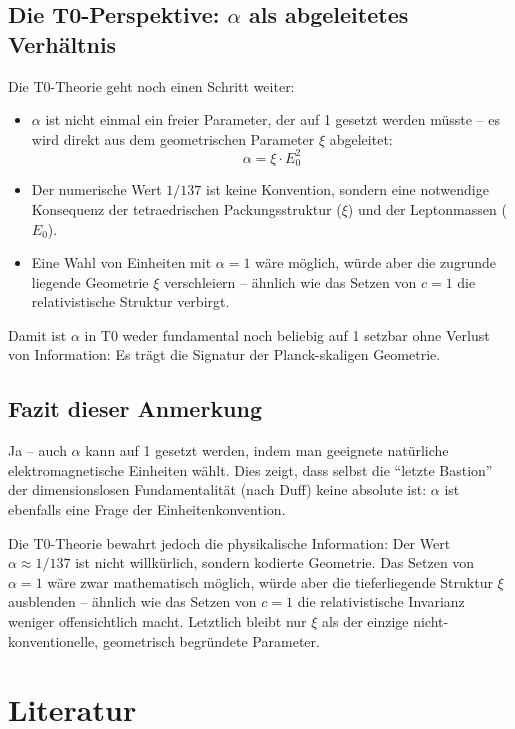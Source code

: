\subsection{Die T0-Perspektive: \(\alpha\) als abgeleitetes Verhältnis}

Die T0-Theorie geht noch einen Schritt weiter:
\begin{itemize}
	\item \(\alpha\) ist nicht einmal ein freier Parameter, der auf 1 gesetzt werden müsste – es wird direkt aus dem geometrischen Parameter \(\xi\) abgeleitet:
	\[
	\alpha = \xi \cdot E_0^2
	\]
	\item Der numerische Wert \(1/137\) ist keine Konvention, sondern eine notwendige Konsequenz der tetraedrischen Packungsstruktur (\(\xi\)) und der Leptonmassen (\(E_0\)).
	\item Eine Wahl von Einheiten mit \(\alpha = 1\) wäre möglich, würde aber die zugrunde liegende Geometrie \(\xi\) verschleiern – ähnlich wie das Setzen von \(c = 1\) die relativistische Struktur verbirgt.
\end{itemize}

Damit ist \(\alpha\) in T0 weder fundamental noch beliebig auf 1 setzbar ohne Verlust von Information: Es trägt die Signatur der Planck-skaligen Geometrie.

\subsection{Fazit dieser Anmerkung}

Ja – auch \(\alpha\) kann auf 1 gesetzt werden, indem man geeignete natürliche elektromagnetische Einheiten wählt. Dies zeigt, dass selbst die ``letzte Bastion'' der dimensionslosen Fundamentalität (nach Duff) keine absolute ist: \(\alpha\) ist ebenfalls eine Frage der Einheitenkonvention.

Die T0-Theorie bewahrt jedoch die physikalische Information: Der Wert \(\alpha \approx 1/137\) ist nicht willkürlich, sondern kodierte Geometrie. Das Setzen von \(\alpha = 1\) wäre zwar mathematisch möglich, würde aber die tieferliegende Struktur \(\xi\) ausblenden – ähnlich wie das Setzen von \(c = 1\) die relativistische Invarianz weniger offensichtlich macht. Letztlich bleibt nur \(\xi\) als der einzige nicht-konventionelle, geometrisch begründete Parameter.

\section{Literatur}

